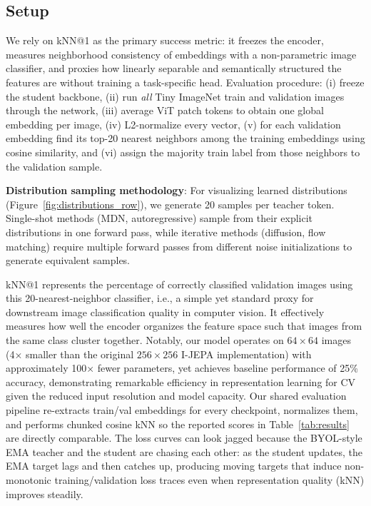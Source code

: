 \documentclass[conference]{IEEEtran}
\begin{document}
\subsection{Setup}
We rely on kNN@1 as the primary success metric: it freezes the encoder, measures neighborhood consistency of embeddings with a non-parametric image classifier, and proxies how linearly separable and semantically structured the features are without training a task-specific head.
Evaluation procedure: (i) freeze the student backbone, (ii) run \emph{all} Tiny ImageNet train and validation images through the network, (iii) average ViT patch tokens to obtain one global embedding per image, (iv) L2-normalize every vector, (v) for each validation embedding find its top-20 nearest neighbors among the training embeddings using cosine similarity, and (vi) assign the majority train label from those neighbors to the validation sample.

\textbf{Distribution sampling methodology}: For visualizing learned distributions (Figure~\ref{fig:distributions_row}), we generate 20 samples per teacher token. Single-shot methods (MDN, autoregressive) sample from their explicit distributions in one forward pass, while iterative methods (diffusion, flow matching) require multiple forward passes from different noise initializations to generate equivalent samples.

kNN@1 represents the percentage of correctly classified validation images using this 20-nearest-neighbor classifier, i.e., a simple yet standard proxy for downstream image classification quality in computer vision.
It effectively measures how well the encoder organizes the feature space such that images from the same class cluster together.
Notably, our model operates on $64\times64$ images (4× smaller than the original $256\times256$ I-JEPA implementation) with approximately 100× fewer parameters, yet achieves baseline performance of 25\% accuracy, demonstrating remarkable efficiency in representation learning for CV given the reduced input resolution and model capacity.
Our shared evaluation pipeline re-extracts train/val embeddings for every checkpoint, normalizes them, and performs chunked cosine kNN so the reported scores in Table~\ref{tab:results} are directly comparable.
The loss curves can look jagged because the BYOL-style EMA teacher and the student are chasing each other: as the student updates, the EMA target lags and then catches up, producing moving targets that induce non-monotonic training/validation loss traces even when representation quality (kNN) improves steadily.
\end{document}
